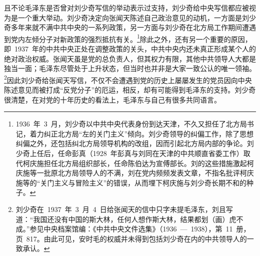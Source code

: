 且不论毛泽东是否曾对刘少奇写信的举动表示过支持，刘少奇给中央写信都应被视为是一个重大举动。刘少奇决定向张闻天陈述自己政治意见的动机，一方面是刘少奇多年来就不满中共中央的一系列政策，另一方面与刘少奇在北方局工作期间遭遇到党内左倾分子对新政策的强烈抵抗有关。\footnote{1936~年~3~月，刘少奇以中共中央代表身份到达天津，不久又担任了北方局书记，着力纠正北方局“左的关门主义”倾向。刘少奇领导的纠偏工作，除了思想纠偏之外，还包括纠北方局领导机构的改组，因而引起北方局内部的争论。刘少奇上任后，任命彭真（1928~年彭真与刘同在天津的中共顺直省委工作）取代柯庆施担任北方局组织部长，任命陈伯达为宣傅部长。刘的这些措施激起柯庆施等一批原北方局领导人的不满，刘在党内频频发表文章，不指名批评柯庆施等的“关门主义与冒险主义”的错误，从而埋下柯庆施与刘少奇长期不和的种子。}除此之外，还有另一个重要的原因，即~1937~年的中共中央正处在调整政策的关头，中共中央内还未真正形成某个人的绝对政治权威。张闻天虽是党的总负责人，但其权力有限，其他中共领导人大都是独当一面；毛泽东尽管处于上升状态，但当时也并非是大家一致公认的唯一领袖。\footnote{刘少奇在~1937~年~3~月~4~日给张闻天的信中只字未提毛泽东，刘且写道：“我国还没有中国的斯大林，任何人想作斯大林，结果都划（画）虎不成。”参见中央档案馆编：《中共中央文件选集》（1936~—~1938），第~11~册，页~817。由此可见，安时毛的权威并未得到包括刘少奇在内的中共领导人的一致承认。}因此刘少奇给张闻天写信，不仅不会遭遇到党的历史上屡屡发生的党员因向中央陈述意见而被打成“反党分子”的厄运，相反，却有可能得到毛泽东的支持。刘少奇很清楚，在对党的十年历史的看法上，毛泽东与自己有很多共同语言。

